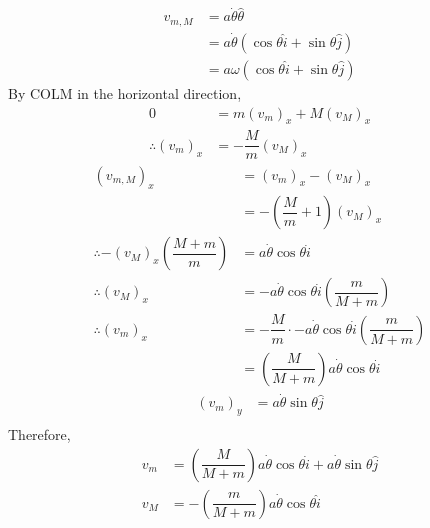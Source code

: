 \documentclass[fleqn, a4paper, 12pt]{article}
\theoremstyle{definition}
\theoremstyle{theorem}
\begin{document}
\begin{align*}
	v_{m, M} &= a \dot{\theta} \hat{\theta}\\
	&= a \dot{\theta} (\cos \theta \hat{i} + \sin \theta \hat{j})\\
	&= a \omega (\cos \theta \hat{i} + \sin \theta \hat{j})
\end{align*}
By COLM in the horizontal direction,
\begin{align*}
	0 &= m (v_m)_x + M (v_M)_x\\
	\therefore (v_m)_x &= - \dfrac{M}{m} (v_M)_x
\end{align*}
\begin{align*}
	(v_{m,M})_x &= (v_m)_x - (v_M)_x\\
	&= -\left( \dfrac{M}{m} + 1 \right) (v_M)_x\\
	\therefore - (v_M)_x \left( \dfrac{M + m}{m} \right) &= a \dot{\theta} \cos \theta \dot{i}\\
	\therefore (v_M)_x &= - a \dot{\theta} \cos \theta \dot{i} \left( \dfrac{m}{M + m} \right)\\
	\therefore (v_m)_x &= -\dfrac{M}{m} \cdot - a \dot{\theta} \cos \theta \dot{i} \left( \dfrac{m}{M + m} \right)\\
	&= \left( \dfrac{M}{M + m} \right) a \dot{\theta} \cos \theta \dot{i}
\end{align*}
\begin{align*}
	(v_m)_y &= a \dot{\theta} \sin \theta \hat{j}\\
\end{align*}
Therefore,
\begin{align*}
	v_m &= \left( \dfrac{M}{M + m} \right) a \dot{\theta} \cos \theta \dot{i} + a \dot{\theta} \sin \theta \hat{j}\\
	v_M &= - \left( \dfrac{m}{M + m} \right) a \dot{\theta} \cos \theta \hat{i}
\end{align*}
\end{document}

